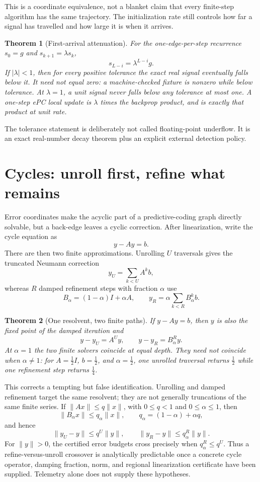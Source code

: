 \documentclass[11pt]{article}
\newtheorem{theorem}{Theorem}[section]
\begin{document}
This is a coordinate equivalence, not a blanket claim that every finite-step algorithm
has the same trajectory. The initialization rate still controls how far a signal has
travelled and how large it is when it arrives.

\begin{theorem}[First-arrival attenuation]\label{thm:wave}
For the one-edge-per-step recurrence $s_0=g$ and $s_{k+1}=\lambda s_k$,
\[
s_{L-i}=\lambda^{L-i}g.
\]
If $|\lambda|<1$, then for every positive tolerance the exact real signal eventually
falls below it. It need not equal zero: a machine-checked fixture is nonzero while below
tolerance. At $\lambda=1$, a unit signal never falls below any tolerance at most one.
A one-step ePC local update is $\lambda$ times the backprop product, and is exactly that
product at unit rate.
\end{theorem}

The tolerance statement is deliberately not called floating-point underflow. It is an
exact real-number decay theorem plus an explicit external detection policy.

\section{Cycles: unroll first, refine what remains}
\label{sec:epc-refinement}

Error coordinates make the acyclic part of a predictive-coding graph directly
solvable, but a back-edge leaves a cyclic correction.  After linearization, write the
cycle equation as
\[
  y-Ay=b.
\]
There are then two finite approximations.  Unrolling $U$ traversals gives the truncated
Neumann correction
\[
  y_U=\sum_{k<U}A^k b,
\]
whereas $R$ damped refinement steps with fraction $\alpha$ use
\[
  B_\alpha=(1-\alpha)I+\alpha A,
  \qquad
  y_R=\alpha\sum_{k<R}B_\alpha^k b.
\]

\begin{theorem}[One resolvent, two finite paths]\label{thm:cyclepaths}
If $y-Ay=b$, then $y$ is also the fixed point of the damped iteration and
\[
  y-y_U=A^U y,
  \qquad
  y-y_R=B_\alpha^R y.
\]
At $\alpha=1$ the two finite solvers coincide at equal depth.  They need not coincide
when $\alpha\ne1$: for $A=\tfrac12 I$, $b=\tfrac12$, and $\alpha=\tfrac12$, one
unrolled traversal returns $\tfrac12$ while one refinement step returns $\tfrac14$.
\end{theorem}

This corrects a tempting but false identification.  Unrolling and damped refinement
target the same resolvent; they are not generally truncations of the same finite series.
If $\|Ax\|\le q\|x\|$, with $0\le q<1$ and $0\le\alpha\le1$, then
\[
  \|B_\alpha x\|\le q_\alpha\|x\|,
  \qquad q_\alpha=(1-\alpha)+\alpha q,
\]
and hence
\[
  \|y_U-y\|\le q^U\|y\|,
  \qquad
  \|y_R-y\|\le q_\alpha^R\|y\|.
\]
For $\|y\|>0$, the certified error budgets cross precisely when
$q_\alpha^R\le q^U$.  Thus a refine-versus-unroll crossover is analytically
predictable once a concrete cycle operator, damping fraction, norm, and regional
linearization certificate have been supplied.  Telemetry alone does not supply these
hypotheses.
\end{document}
